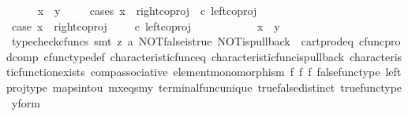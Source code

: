 \begin{isabellebody}
\ \ \ \ \isamarkupfalse%
\ {\isachardoublequoteopen}x\ {\isacharequal}{\kern0pt}\ y{\isachardoublequoteclose}\isanewline
\ \ \ \ \isamarkupfalse%
{\isacharparenleft}{\kern0pt}cases\ {\isachardoublequoteopen}x\ {\isacharequal}{\kern0pt}\ right{\isacharunderscore}{\kern0pt}coproj\ {\isasymone}\ {\isacharparenleft}{\kern0pt}{\isasymone}{\isasymCoprod}{\isasymone}{\isacharparenright}{\kern0pt}{\isasymcirc}\isactrlsub c\ left{\isacharunderscore}{\kern0pt}coproj\ {\isasymone}\ {\isasymone}{\isachardoublequoteclose}{\isacharparenright}{\kern0pt}\isanewline
\ \ \ \ \ \ \isamarkupfalse%
\ case{}{\isacharcolon}{\kern0pt}\ {\isachardoublequoteopen}x\ {\isacharequal}{\kern0pt}\ right{\isacharunderscore}{\kern0pt}coproj\ {\isasymone}\ {\isacharparenleft}{\kern0pt}{\isasymone}\ {\isasymCoprod}\ {\isasymone}{\isacharparenright}{\kern0pt}\ {\isasymcirc}\isactrlsub c\ left{\isacharunderscore}{\kern0pt}coproj\ {\isasymone}\ {\isasymone}{\isachardoublequoteclose}\isanewline
\ \ \ \ \ \ \isamarkupfalse%
\ \isamarkupfalse%
\ {\isachardoublequoteopen}x\ {\isacharequal}{\kern0pt}\ y{\isachardoublequoteclose}\isanewline
\ \ \ \ \ \ \ \ \isamarkupfalse%
\ {\isacharparenleft}{\kern0pt}typecheck{\isacharunderscore}{\kern0pt}cfuncs{\isacharcomma}{\kern0pt}\ smt\ {\isacharparenleft}{\kern0pt}z{}{\isacharparenright}{\kern0pt}\ a{}\ NOT{\isacharunderscore}{\kern0pt}false{\isacharunderscore}{\kern0pt}is{\isacharunderscore}{\kern0pt}true\ NOT{\isacharunderscore}{\kern0pt}is{\isacharunderscore}{\kern0pt}pullback\ \ cart{\isacharunderscore}{\kern0pt}prod{\isacharunderscore}{\kern0pt}eq{}\ cfunc{\isacharunderscore}{\kern0pt}prod{\isacharunderscore}{\kern0pt}comp\ cfunc{\isacharunderscore}{\kern0pt}type{\isacharunderscore}{\kern0pt}def\ characteristic{\isacharunderscore}{\kern0pt}func{\isacharunderscore}{\kern0pt}eq\ characteristic{\isacharunderscore}{\kern0pt}func{\isacharunderscore}{\kern0pt}is{\isacharunderscore}{\kern0pt}pullback\ characteristic{\isacharunderscore}{\kern0pt}function{\isacharunderscore}{\kern0pt}exists\ comp{\isacharunderscore}{\kern0pt}associative\ element{\isacharunderscore}{\kern0pt}monomorphism\ f{}\ f{}\ f{}\ false{\isacharunderscore}{\kern0pt}func{\isacharunderscore}{\kern0pt}type\ left{\isacharunderscore}{\kern0pt}proj{\isacharunderscore}{\kern0pt}type\ maps{\isacharunderscore}{\kern0pt}into{\isacharunderscore}{\kern0pt}{}u{}\ mx{\isacharunderscore}{\kern0pt}eqs{\isacharunderscore}{\kern0pt}my\ terminal{\isacharunderscore}{\kern0pt}func{\isacharunderscore}{\kern0pt}unique\ true{\isacharunderscore}{\kern0pt}false{\isacharunderscore}{\kern0pt}distinct\ true{\isacharunderscore}{\kern0pt}func{\isacharunderscore}{\kern0pt}type\ y{\isacharunderscore}{\kern0pt}form{\isacharparenright}{\kern0pt}\isanewline

\end{isabellebody}

